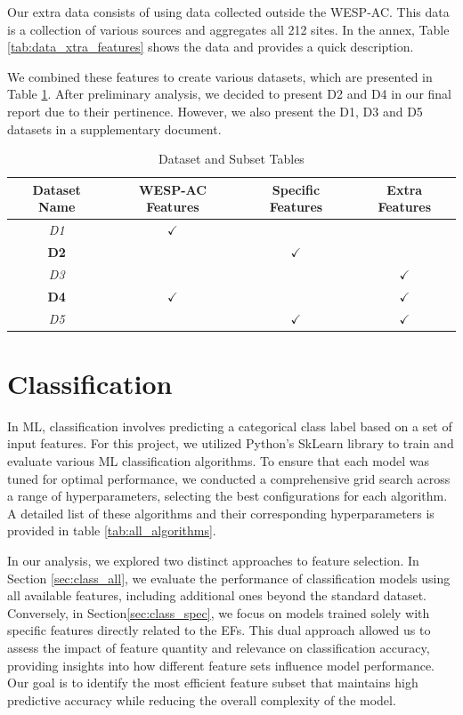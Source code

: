 \documentclass[12pt,letterpaper]{article}
\begin{document}
Our extra data consists of using data collected outside the \ac{WESP-AC}.
This data is a collection of various sources and aggregates all 212 sites.
In the annex, Table \ref{tab:data_xtra_features} shows the data and provides a quick description.

We combined these features to create various datasets, which are presented in Table \ref{table:subdatasets}.
After preliminary analysis, we decided to present D2 and D4 in our final report due to their pertinence.
However, we also present the D1, D3 and D5 datasets in a supplementary document.

\begin{table}[h!]
\centering
\begin{tabular}{|c|c|c|c|}
\hline
\textbf{Dataset Name} & \textbf{WESP-AC Features} & \textbf{Specific Features} & \textbf{Extra Features} \\
\hline
\textit{D1} & $\checkmark$ &  &  \\
\hline
\textbf{D2} &  & $\checkmark$ &  \\ 
\hline
\textit{D3} &  & & $\checkmark$\\
\hline
\textbf{D4} &$\checkmark$ &  & $\checkmark$ \\
\hline
\textit{D5} &  & $\checkmark$ & $\checkmark$ \\
\hline
\end{tabular}
\caption{Dataset and Subset Tables}
\label{table:subdatasets}
\end{table}








\clearpage
\section{Classification}\label{sec:class}
In \ac{ML}, classification involves predicting a categorical class label based on a set of input features.
For this project, we utilized Python's SkLearn library to train and evaluate various \ac{ML} classification algorithms.
To ensure that each model was tuned for optimal performance, we conducted a comprehensive grid search across a range of hyperparameters, selecting the best configurations for each algorithm.
A detailed list of these algorithms and their corresponding hyperparameters is provided in table \ref{tab:all_algorithms}.

In our analysis, we explored two distinct approaches to feature selection.
In Section \ref{sec:class_all}, we evaluate the performance of classification models using all available features, including additional ones beyond the standard dataset.
Conversely, in Section\ref{sec:class_spec}, we focus on models trained solely with specific features directly related to the \acp{EF}.
This dual approach allowed us to assess the impact of feature quantity and relevance on classification accuracy, providing insights into how different feature sets influence model performance.
Our goal is to identify the most efficient feature subset that maintains high predictive accuracy while reducing the overall complexity of the model.
\end{document}
